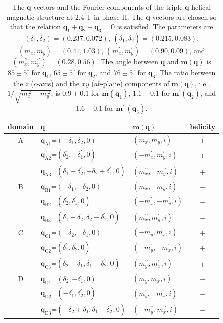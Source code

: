 \documentclass[aps,prb,reprint,superscriptaddress,amsmath,amssymb]{revtex4-2}
\begin{document}
\begin{table}
\caption{The $\bm{q}$ vectors and the Fourier components of the triple-$\bm{q}$ helical magnetic structure at 2.4 T in phase II. 
The $\bm{q}$ vectors are chosen so that the relation $\bm{q}_1 + \bm{q}_2 + \bm{q}_3 = 0$ is satisfied.
The parameters are $(\delta_1, \delta_2)=(0.237, 0.072)$, $(\delta_1^{\prime}, \delta_2^{\prime})=(0.215, 0.083)$, 
$(m_x, m_y)=(0.41, 1.03)$, $(m_x^{\prime}, m_y^{\prime})=(0.90, 0.09)$, and $(m_x^{\prime\prime}, m_y^{\prime\prime})=(0.28, 0.56)$. 
The angle between $\bm{q}$ and $\bm{m}(\bm{q})$ is $85 \pm 5^{\circ}$ for $\bm{q}_1$, $65 \pm 5^{\circ}$ for $\bm{q}_2$, and $76 \pm 5^{\circ}$ for $\bm{q}_3$.  
The ratio between the $z$ ($c$-axis) and the $xy$ ($ab$-plane) components of $\bm{m}(\bm{q})$, i.e., $1/\sqrt{m_x^{\;2} + m_y^{\;2}}$, is  $0.9 \pm 0.1$ for $\bm{m}(\bm{q}_1)$, $1.1 \pm 0.1$ for $\bm{m}^{\prime}(\bm{q}_2)$, and $1.6 \pm 0.1$ for $\bm{m}^{\prime\prime}(\bm{q}_3)$. }
\label{tbl:mq24kG}
\begin{tabular}{cllc}
\hline
domain & \hspace{10mm} $\bm{q}$ & \hspace{3mm} $\bm{m}(\bm{q})$ & helicity \\
\hline
A & $\bm{q}_{\text{A1}}$=$(-\delta_1, \delta_2, 0)$ & $( m_x, m_y, i)$  & $+$ \\
  & $\bm{q}_{\text{A2}}$=$(\delta_2^{\prime}, -\delta_1^{\prime}, 0)$ & $( -m_x^{\prime}, m_y^{\prime}, i)$  & $+$ \\
  & $\bm{q}_{\text{A3}}$=$(\delta_1 - \delta_2^{\prime}, -\delta_2 + \delta_1^{\prime}, 0)$ & $( m_x^{\prime\prime}, -m_y^{\prime\prime}, i)$  & $+$ \\
B & $\bm{q}_{\text{B1}}$=$(-\delta_1, -\delta_2, 0)$ & $( m_x, -m_y, i)$  & $-$ \\
  & $\bm{q}_{\text{B2}}$=$(\delta_2^{\prime}, \delta_1^{\prime}, 0)$ & $( -m_x^{\prime}, -m_y^{\prime}, i)$  & $-$ \\
  & $\bm{q}_{\text{B3}}$=$(\delta_1 - \delta_2^{\prime}, \delta_2 - \delta_1^{\prime}, 0)$ & $( m_x^{\prime\prime}, m_y^{\prime\prime}, i)$  & $-$ \\
C & $\bm{q}_{\text{C1}}$=$(-\delta_2, -\delta_1, 0)$ & $( -m_y, m_x, i)$  & $+$ \\
  & $\bm{q}_{\text{C2}}$=$(\delta_1^{\prime}, \delta_2^{\prime}, 0)$ & $( -m_y^{\prime}, -m_x^{\prime}, i)$  & $+$ \\
  & $\bm{q}_{\text{C3}}$=$(\delta_2 - \delta_1^{\prime}, \delta_1 - \delta_2^{\prime}, 0)$ & $( m_y^{\prime\prime}, m_x^{\prime\prime}, i)$   & $+$ \\
D & $\bm{q}_{\text{D1}}$=$(\delta_2, -\delta_1, 0)$ & $( m_y, m_x, i)$  & $-$ \\
  & $\bm{q}_{\text{D2}}$=$(-\delta_1^{\prime}, \delta_2^{\prime}, 0)$ & $( m_y^{\prime}, -m_x^{\prime}, i)$  & $-$ \\
  & $\bm{q}_{\text{D3}}$=$(-\delta_2 + \delta_1^{\prime}, \delta_1 - \delta_2^{\prime}, 0)$ & $( -m_y^{\prime\prime}, m_x^{\prime\prime}, i)$  & $-$ \\
\hline
\end{tabular}
\end{table}
\end{document}
